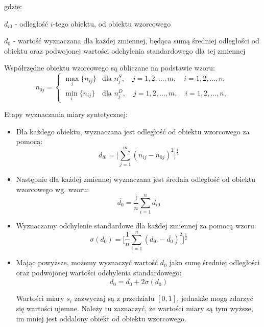 \documentclass[12pt,a4paper]{report}
\begin{document}
gdzie:

$d_{i0}$ - odległość $i$-tego obiektu, od obiektu wzorcowego

$d_{0}$ - wartość wyznaczana dla każdej zmiennej, będąca sumą średniej odległości od obiektu oraz podwojonej wartości odchylenia standardowego dla tej zmiennej

Współrzędne obiektu wzorcowego są obliczane na podstawie wzoru:
$$n_{0j}=\left\{ \begin{array}{ll}
\max\limits_{i} \{n_{ij}\} & \textrm{dla  } n_{j}^S,\quad j=1,2,\dots,m, \quad i=1,2,\dots,n, \\
\min\limits_{i} \{n_{ij}\} & \textrm{dla } n_{j}^D, \quad j=1,2,\dots,m, \quad i=1,2,\dots,n,
\end{array} \right. $$

Etapy wyznaczania miary syntetycznej:
\begin{itemize}
\item Dla każdego obiektu, wyznaczana jest odległość od obiektu wzorcowego za pomocą:
$$d_{i0}=\bigg[\sum_{j=1}^{m} (n_{ij} - n_{0j})^2 \bigg]^\frac{1}{2}  $$ 
\item Następnie dla każdej zmiennej wyznaczana jest średnia odległość od obiektu wzorcowego wg. wzoru:
$$\overline{d_{0}}=\frac{1}{n}\sum_{i=1}^{n} d_{i0} $$
\item Wyznaczamy odchylenie standardowe dla każdej zmiennej za pomocą wzoru: 
$$\sigma(d_{0})=\bigg[\frac{1}{n}\sum_{i=1}^{n} (d_{i0}-\overline{d_{0}})^2 \bigg]^\frac{1}{2} $$
\item Mając powyższe, możemy wyznaczyć wartość $d_{0}$ jako sumę średniej odległości oraz podwojonej wartości odchylenia standardowego:
$$d_{0}=\overline{d_{0}} + 2\sigma(d_{0}) $$


Wartości miary $s_{i}$ zazwyczaj są z przedziału $[0, 1]$, jednakże mogą zdarzyć się wartości ujemne. Należy tu zaznaczyć, że wartości miary są tym wyższe, im mniej jest oddalony obiekt od obiektu wzorcowego. 

\end{itemize}
%
%
\end{document}
